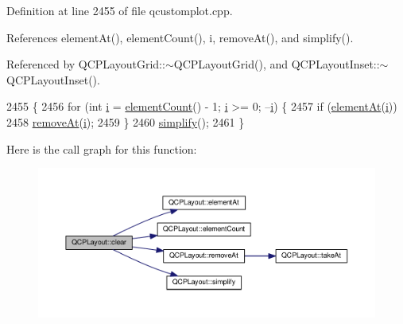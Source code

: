 Definition at line 2455 of file qcustomplot.\+cpp.



References element\+At(), element\+Count(), i, remove\+At(), and simplify().



Referenced by Q\+C\+P\+Layout\+Grid\+::$\sim$\+Q\+C\+P\+Layout\+Grid(), and Q\+C\+P\+Layout\+Inset\+::$\sim$\+Q\+C\+P\+Layout\+Inset().


\begin{DoxyCode}
2455                       \{
2456   \textcolor{keywordflow}{for} (\textcolor{keywordtype}{int} \hyperlink{_comparision_pictures_2_createtest_image_8m_a6f6ccfcf58b31cb6412107d9d5281426}{i} = \hyperlink{class_q_c_p_layout_a39d3e9ef5d9b82ab1885ba1cb9597e56}{elementCount}() - 1; \hyperlink{_comparision_pictures_2_createtest_image_8m_a6f6ccfcf58b31cb6412107d9d5281426}{i} >= 0; --\hyperlink{_comparision_pictures_2_createtest_image_8m_a6f6ccfcf58b31cb6412107d9d5281426}{i}) \{
2457     \textcolor{keywordflow}{if} (\hyperlink{class_q_c_p_layout_afa73ca7d859f8a3ee5c73c9b353d2a56}{elementAt}(\hyperlink{_comparision_pictures_2_createtest_image_8m_a6f6ccfcf58b31cb6412107d9d5281426}{i}))
2458       \hyperlink{class_q_c_p_layout_a2403f684fee3ce47132faaeed00bb066}{removeAt}(\hyperlink{_comparision_pictures_2_createtest_image_8m_a6f6ccfcf58b31cb6412107d9d5281426}{i});
2459   \}
2460   \hyperlink{class_q_c_p_layout_a41e6ac049143866e8f8b4964efab01b2}{simplify}();
2461 \}
\end{DoxyCode}


Here is the call graph for this function\+:\nopagebreak
\begin{figure}[H]
\begin{center}
\leavevmode
\includegraphics[width=350pt]{class_q_c_p_layout_a02883bdf2769b5b227f0232dba1ac4ee_cgraph}
\end{center}
\end{figure}




